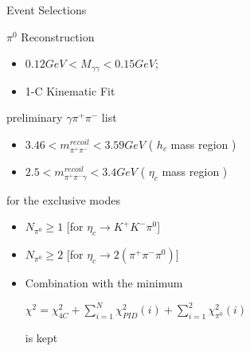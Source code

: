 \documentclass{beamer}
\begin{document}
\begin{frame}{Event Selections}
  \begin{block}{$\pi^0$ Reconstruction}
    \begin{itemize}
      \item $0.12GeV<M_{\gamma\gamma}<0.15GeV$;
      \item 1-C Kinematic Fit
    \end{itemize}
  \end{block}
  \begin{block}{preliminary $\gamma\pi^+\pi^-$ list}
    \begin{itemize}
      \item $3.46<m_{\pi^+\pi^-}^{recoil}<3.59 GeV$ ( $h_c$ mass region )
      \item $2.5<m_{\pi^+\pi^-\gamma}^{recoil}<3.4 GeV$ ( $\eta_c$ mass region )
    \end{itemize}
  \end{block}
  \begin{block}{for the exclusive modes}
    \begin{itemize}
      \item  $N_{\pi^0}\geq 1$ [for $\eta_c\to K^+K^-\pi^0$]
      \item  $N_{\pi^0}\geq 2$ [for $\eta_c\to 2(\pi^+\pi^-\pi^0)$]
      \item Combination with the minimum 
        \begin{center}
          $\chi^2 = \chi^2_{4C} + \sum^N_{i=1}\chi^2_{PID}(i)+\sum^2_{i=1}\chi^2_{\pi^0}(i)$
        \end{center}is kept 
    \end{itemize}
  \end{block}
\end{frame}
\end{document}
